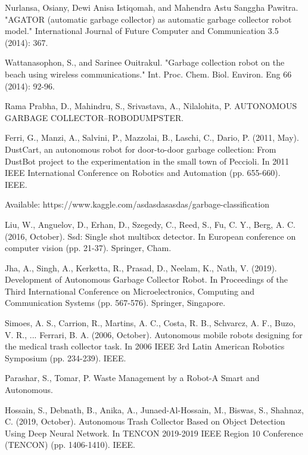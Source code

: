\documentclass[conference]{IEEEtran}
\begin{document}
	
	
	\begin{thebibliography}{00}
		 Nurlansa, Osiany, Dewi Anisa Istiqomah, and Mahendra Astu Sanggha Pawitra. "AGATOR (automatic garbage collector) as automatic garbage collector robot model." International Journal of Future Computer and Communication 3.5 (2014): 367.
		
		Wattanasophon, S., and Sarinee Ouitrakul. "Garbage collection robot on the beach using wireless communications." Int. Proc. Chem. Biol. Environ. Eng 66 (2014): 92-96.
		
		Rama Prabha, D., Mahindru, S., Srivastava, A.,  Nilalohita, P. AUTONOMOUS GARBAGE COLLECTOR–ROBODUMPSTER.
		
		Ferri, G., Manzi, A., Salvini, P., Mazzolai, B., Laschi, C.,  Dario, P. (2011, May). DustCart, an autonomous robot for door-to-door garbage collection: From DustBot project to the experimentation in the small town of Peccioli. In 2011 IEEE International Conference on Robotics and Automation (pp. 655-660). IEEE.
		
		 Available: https://www.kaggle.com/asdasdasasdas/garbage-classification
		
		Liu, W., Anguelov, D., Erhan, D., Szegedy, C., Reed, S., Fu, C. Y.,  Berg, A. C. (2016, October). Ssd: Single shot multibox detector. In European conference on computer vision (pp. 21-37). Springer, Cham.
		
		Jha, A., Singh, A., Kerketta, R., Prasad, D., Neelam, K.,  Nath, V. (2019). Development of Autonomous Garbage Collector Robot. In Proceedings of the Third International Conference on Microelectronics, Computing and Communication Systems (pp. 567-576). Springer, Singapore.
		
		Simoes, A. S., Carrion, R., Martins, A. C., Costa, R. B., Schvarcz, A. F., Buzo, V. R., ...  Ferrari, B. A. (2006, October). Autonomous mobile robots designing for the medical trash collector task. In 2006 IEEE 3rd Latin American Robotics Symposium (pp. 234-239). IEEE.
		
		Parashar, S.,  Tomar, P. Waste Management by a Robot-A Smart and Autonomous.
		
		Hossain, S., Debnath, B., Anika, A., Junaed-Al-Hossain, M., Biswas, S.,  Shahnaz, C. (2019, October). Autonomous Trash Collector Based on Object Detection Using Deep Neural Network. In TENCON 2019-2019 IEEE Region 10 Conference (TENCON) (pp. 1406-1410). IEEE.
		
	\end{thebibliography}
	\vspace{12pt}
	
	
\end{document}
